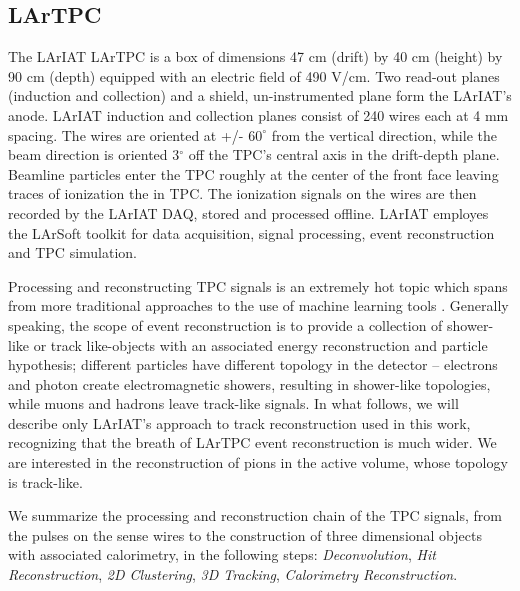 \documentclass[aps,prl,twocolumn,showpacs,superscriptaddress,groupedaddress]{revtex4}  %
\begin{document}
\subsection{\label{sec:LArTPC}LArTPC}

The LArIAT LArTPC is a box of dimensions 47 cm (drift) by 40 cm (height) by 90 cm (depth) equipped with an  electric field of 490 V/cm. Two read-out planes (induction and collection) and a shield, un-instrumented plane form the LArIAT's anode. LArIAT induction and collection planes consist of 240 wires each at 4 mm spacing. The wires are oriented at +/- $60^{\circ}$ from the vertical direction, while the beam direction is oriented 3$^\circ$ off the TPC's central axis in the drift-depth  plane.   Beamline particles enter the TPC roughly at the center of the front face leaving traces of ionization the in TPC. The ionization signals on the wires are then recorded by the LArIAT DAQ, stored and processed offline. LArIAT employes the LArSoft toolkit \cite{LArSoft} for data acquisition, signal processing, event reconstruction and TPC simulation. 

Processing and reconstructing TPC signals is an extremely hot topic which spans from more traditional approaches \cite{Barker2011} to the use of machine learning tools \cite{1748-0221-12-03-P03011}. Generally speaking, the scope of event reconstruction is to provide a collection of shower-like or track like-objects with an associated energy reconstruction and particle hypothesis; different particles have different topology in the detector -- electrons and photon create electromagnetic showers,  resulting in shower-like topologies, while muons and hadrons  leave track-like signals.  In what follows, we will describe only LArIAT's approach to track reconstruction used in this work, recognizing  that the breath of LArTPC event reconstruction is much wider. We are interested in the reconstruction of pions in the active volume, whose topology is track-like.

We summarize the processing and reconstruction chain of the TPC signals, from the pulses on the sense wires to the construction of three dimensional objects with associated calorimetry,  in the following steps: \emph{Deconvolution}, \emph{Hit Reconstruction}, \emph{2D Clustering}, \emph{3D Tracking}, \emph{Calorimetry Reconstruction}. \\ %

\end{document}
